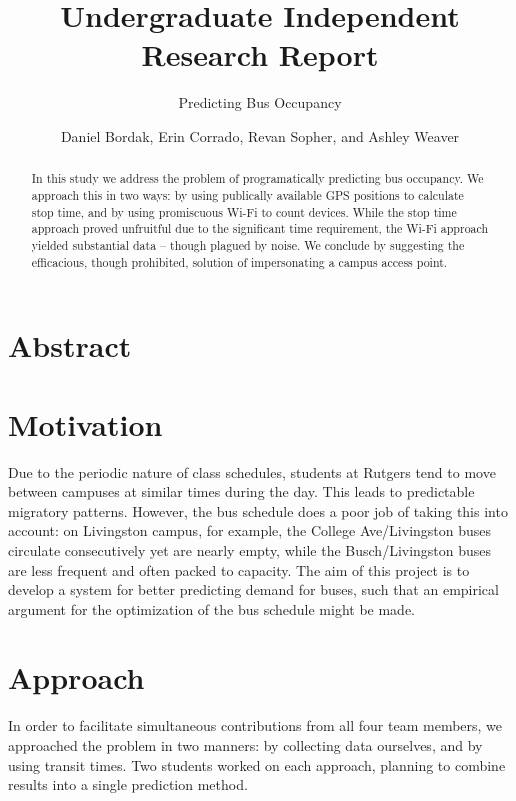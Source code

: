 \documentclass[letterpaper]{scrartcl}
\begin{document}
\title{Undergraduate Independent Research Report}
\subtitle{Predicting Bus Occupancy}
\author{Daniel Bordak, Erin Corrado, Revan Sopher, and Ashley Weaver}

\maketitle

\section*{Abstract}
\begin{abstract}
In this study we address the problem of programatically predicting bus occupancy.
We approach this in two ways: by using publically available GPS positions to calculate stop time, and by using promiscuous Wi-Fi to count devices.
While the stop time approach proved unfruitful due to the significant time requirement, the Wi-Fi approach yielded substantial data -- though plagued by noise.
We conclude by suggesting the efficacious, though prohibited, solution of impersonating a campus access point.
\end{abstract}

\section*{Motivation}

Due to the periodic nature of class schedules, students at Rutgers tend to move between campuses at similar times during the day.
This leads to predictable migratory patterns. However, the bus schedule does a poor job of taking this into account: on Livingston campus, for example, the College Ave/Livingston buses circulate consecutively yet are nearly empty, while the Busch/Livingston buses are less frequent and often packed to capacity.
The aim of this project is to develop a system for better predicting demand for buses, such that an empirical argument for the optimization of the bus schedule might be made.

\section*{Approach}

In order to facilitate simultaneous contributions from all four team members, we approached the problem in two manners: by collecting data ourselves, and by using transit times.
Two students worked on each approach, planning to combine results into a single prediction method.
\end{document}
